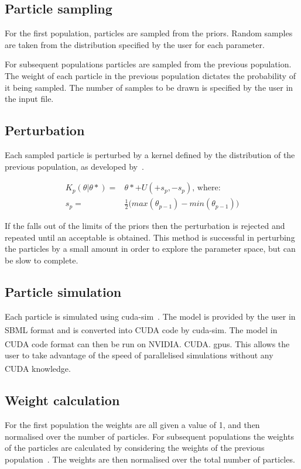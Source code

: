 \subsection{Particle sampling}
\label{sec:part_samp}
For the first population, particles are sampled from the priors. Random samples are taken from the distribution specified by the user for each parameter. 

For subsequent populations particles are sampled from the previous population. The weight of each particle in the previous population dictates the probability of it being sampled. The number of samples to be drawn is specified by the user in the input file.  

\subsection{Perturbation}
\label{sec:pertub}
Each sampled particle is perturbed by a kernel defined by the distribution of the previous population, as developed by~\textcite{Toni:2009tr}. 

\begin{align}
K_p(\theta|\theta* ) =& \theta* + U(+s_p, -s_p)\text{, where:} \\
s_p =& \frac{1}{2} \big (max(\theta_{p-1}) - min(\theta_{p-1}) \big )
\end{align}

If the \texttheta* falls out of the limits of the priors then the perturbation is rejected and repeated until an acceptable \texttheta* is obtained. This method is successful in perturbing the particles by a small amount in order to explore the parameter space, but can be slow to complete. 

\subsection{Particle simulation}
\label{sec:sim}
Each particle is simulated using cuda-sim~\autocite{Zhou:2011hp}. The model is provided by the user in SBML format and is converted into CUDA\textsuperscript{\textregistered} code by cuda-sim. The model in CUDA\textsuperscript{\textregistered} code format can then be run on NVIDIA\textsuperscript{\textregistered}. CUDA\textsuperscript{\textregistered}. \acrshort{gpu}s. This allows the user to take advantage of the speed of parallelised simulations without any CUDA\textsuperscript{\textregistered} knowledge. 


\subsection{Weight calculation}
\label{sec:weight}
For the first population the weights are all given a value of 1, and then normalised over the number of particles. For subsequent populations the weights of the particles are calculated by considering the weights of the previous population~\autocite{Toni:2009tr}. The weights are then normalised over the total number of particles. 


